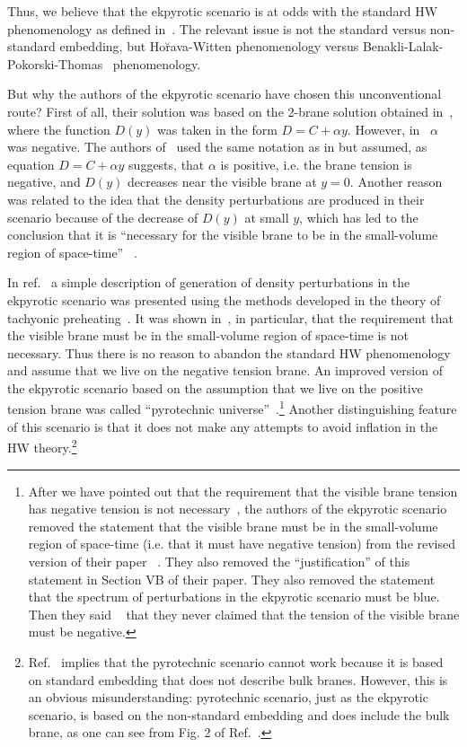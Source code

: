 \documentclass[a4paper,12pt]{article}
\begin{document}
 
Thus, we believe that the ekpyrotic scenario is at odds with the standard HW phenomenology as defined in~\cite{HoravaWitten}. The relevant issue is not the standard versus non-standard embedding,  but Ho\u{r}ava-Witten phenomenology \cite{HoravaWitten} versus   
Benakli-Lalak-Pokorski-Thomas~\cite{Benakli:1999sy} phenomenology.

But why the authors of the ekpyrotic scenario have chosen  this unconventional route? First of all, their solution was based on the 2-brane solution obtained in~\cite{universe}, where the
function $D(y)$ was taken in the form $D= C + \alpha y$. However, in~\cite{universe} $\alpha$ was negative.  The authors of~\cite{KOST} used the same notation as in \cite{universe} but assumed, as equation $D= C + \alpha y$ suggests, that  $\alpha$ is positive, i.e. the brane tension  is negative,  and $D(y)$ decreases near the visible brane at $y = 0$. Another reason was related to the idea that the density perturbations are produced in their scenario because of the decrease of $D(y)$ at small $y$, which has led to the conclusion that it is  ``necessary  for the visible brane to be in the small-volume region of space-time'' ~\cite{KOST}.  

In ref.~\cite{KKL} a  simple description of generation of density   
perturbations in the ekpyrotic scenario was presented using the methods developed in the theory of   
tachyonic preheating~\cite{tach}. It was  shown in~\cite{KKL}, in   
particular, that the requirement that the visible brane must be in the   
small-volume region of space-time is not necessary. Thus there is no   
reason to abandon the standard HW phenomenology and assume that we live on   
the negative tension brane. An improved version of the ekpyrotic scenario   
based on the assumption that we live on the positive tension brane was   
called   ``pyrotechnic universe''~\cite{KKL}.\footnote{
After we have pointed out that the requirement that the visible brane tension has negative tension is not necessary~\cite{KKL}, the authors of the ekpyrotic scenario  removed the statement that the visible brane must be in the small-volume region of space-time (i.e. that it must have negative tension) from the revised version of their paper ~\cite{KOST}. They also removed  the ``justification'' of this statement in Section VB of their paper. They also removed the statement that the spectrum of perturbations in the ekpyrotic scenario must be blue.  Then they said ~\cite{Khoury:2001iy} that they never claimed that the tension of the visible brane must be negative. }  Another distinguishing feature of this scenario is that it does not make any attempts to avoid inflation in the HW theory.\footnote{Ref.~\cite{Khoury:2001iy} implies that the pyrotechnic scenario cannot work because it is based on standard embedding that does not describe bulk branes. However, this is an obvious misunderstanding: pyrotechnic scenario, just as the ekpyrotic scenario, is based on the non-standard embedding and does include the bulk brane, as one can see from Fig. 2 of Ref.~\cite{KKL}.}
\end{document}
